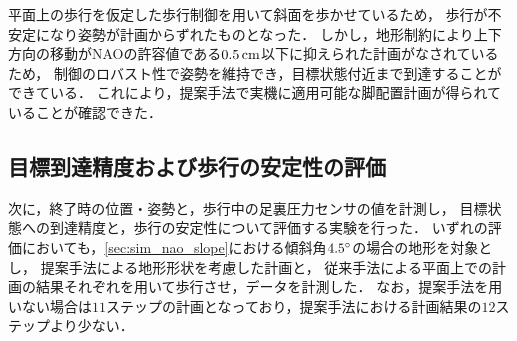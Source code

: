 \documentclass[autodetect-engine,dvipdfmx-if-dvi,ja=standard,a4j,jbase=11pt,magstyle=nomag*]{bxjsreport}
\begin{document}
平面上の歩行を仮定した歩行制御を用いて斜面を歩かせているため，
歩行が不安定になり姿勢が計画からずれたものとなった．
しかし，地形制約により上下方向の移動がNAOの許容値である$0.5\,\si{\centi\meter}$以下に抑えられた計画がなされているため，
制御のロバスト性で姿勢を維持でき，目標状態付近まで到達することができている．
これにより，提案手法で実機に適用可能な脚配置計画が得られていることが確認できた．


\subsection{目標到達精度および歩行の安定性の評価}
次に，終了時の位置・姿勢と，歩行中の足裏圧力センサの値を計測し，
目標状態への到達精度と，歩行の安定性について評価する実験を行った．
いずれの評価においても，\cref{sec:sim_nao_slope}における傾斜角$4.5\degree$の場合の地形を対象とし，
提案手法による地形形状を考慮した計画と，
従来手法による平面上での計画の結果それぞれを用いて歩行させ，データを計測した．
なお，提案手法を用いない場合は$11$ステップの計画となっており，提案手法における計画結果の$12$ステップより少ない．
\end{document}
